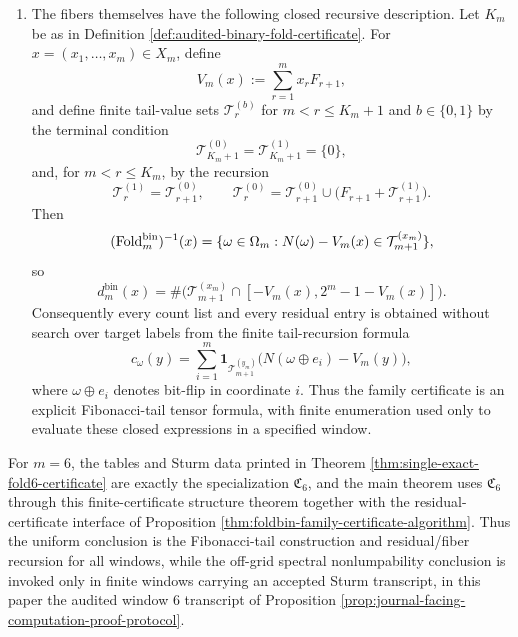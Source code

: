 \begin{theorem}
\begin{enumerate}[label=\textup{(\roman*)}]
\item The fibers themselves have the following closed recursive description.  Let \(K_m\) be as in Definition \ref{def:audited-binary-fold-certificate}.  For \(x=(x_1,\ldots,x_m)\in X_m\), define
\[
V_m(x):=\sum_{r=1}^{m}x_rF_{r+1},
\]
and define finite tail-value sets \(\mathcal T_r^{(b)}\) for \(m<r\le K_m+1\) and \(b\in\{0,1\}\) by the terminal condition
\[
\mathcal T_{K_m+1}^{(0)}=\mathcal T_{K_m+1}^{(1)}=\{0\},
\]
and, for \(m<r\le K_m\), by the recursion
\[
\mathcal T_r^{(1)}=\mathcal T_{r+1}^{(0)},
\qquad
\mathcal T_r^{(0)}=
\mathcal T_{r+1}^{(0)}\cup\bigl(F_{r+1}+\mathcal T_{r+1}^{(1)}\bigr).
\]
Then
\[
(\operatorname{Fold}_m^{\mathrm{bin}})^{-1}(x)
=\{\omega\in\Omega_m:N(\omega)-V_m(x)\in\mathcal T_{m+1}^{(x_m)}\},
\]
so
\[
d_m^{\mathrm{bin}}(x)
=\#\bigl(\mathcal T_{m+1}^{(x_m)}\cap[-V_m(x),2^m-1-V_m(x)]\bigr).
\]
Consequently every count list and every residual entry is obtained without search over target labels from the finite tail-recursion formula
\[
c_\omega(y)=\sum_{i=1}^{m}\mathbf 1_{\mathcal T_{m+1}^{(y_m)}}
\bigl(N(\omega\oplus e_i)-V_m(y)\bigr),
\]
where \(\omega\oplus e_i\) denotes bit-flip in coordinate \(i\).  Thus the family certificate is an explicit Fibonacci-tail tensor formula, with finite enumeration used only to evaluate these closed expressions in a specified window.
\end{enumerate}
For \(m=6\), the tables and Sturm data printed in Theorem \ref{thm:single-exact-fold6-certificate} are exactly the specialization \(\mathfrak C_6\), and the main theorem uses \(\mathfrak C_6\) through this finite-certificate structure theorem together with the residual-certificate interface of Proposition \ref{thm:foldbin-family-certificate-algorithm}.  Thus the uniform conclusion is the Fibonacci-tail construction and residual/fiber recursion for all windows, while the off-grid spectral nonlumpability conclusion is invoked only in finite windows carrying an accepted Sturm transcript, in this paper the audited window \(6\) transcript of Proposition \ref{prop:journal-facing-computation-proof-protocol}.
\end{theorem}

